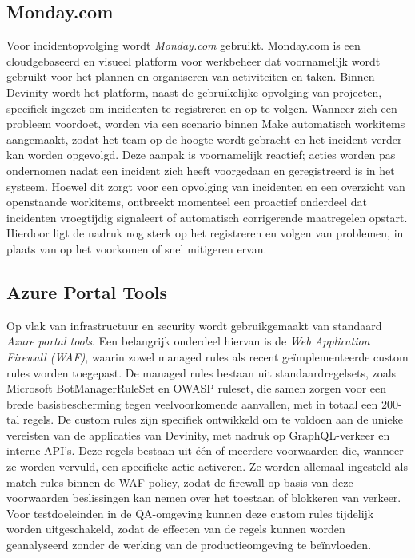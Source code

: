 \subsection{Monday.com}
Voor incidentopvolging wordt \textit{Monday.com} gebruikt. Monday.com is een cloudgebaseerd en visueel platform voor werkbeheer dat voornamelijk wordt gebruikt voor het plannen en organiseren van activiteiten en taken. Binnen Devinity wordt het platform, naast de gebruikelijke opvolging van projecten, specifiek ingezet om incidenten te registreren en op te volgen. Wanneer zich een probleem voordoet, worden via een scenario binnen Make automatisch workitems aangemaakt, zodat het team op de hoogte wordt gebracht en het incident verder kan worden opgevolgd. Deze aanpak is voornamelijk reactief; acties worden pas ondernomen nadat een incident zich heeft voorgedaan en geregistreerd is in het systeem. Hoewel dit zorgt voor een opvolging van incidenten en een overzicht van openstaande workitems, ontbreekt momenteel een proactief onderdeel dat incidenten vroegtijdig signaleert of automatisch corrigerende maatregelen opstart. Hierdoor ligt de nadruk nog sterk op het registreren en volgen van problemen, in plaats van op het voorkomen of snel mitigeren ervan.

\subsection{Azure Portal Tools}
Op vlak van infrastructuur en security wordt gebruikgemaakt van standaard \textit{Azure portal tools}. Een belangrijk onderdeel hiervan is de \textit{Web Application Firewall (WAF)}, waarin zowel managed rules als recent geïmplementeerde custom rules worden toegepast. De managed rules bestaan uit standaardregelsets, zoals Microsoft BotManagerRuleSet en OWASP ruleset, die samen zorgen voor een brede basisbescherming tegen veelvoorkomende aanvallen, met in totaal  een 200-tal regels. De custom rules zijn specifiek ontwikkeld om te voldoen aan de unieke vereisten van de applicaties van Devinity, met nadruk op GraphQL-verkeer en interne API’s. Deze regels bestaan uit één of meerdere voorwaarden die, wanneer ze worden vervuld, een specifieke actie activeren. Ze worden allemaal ingesteld als match rules binnen de WAF-policy, zodat de firewall op basis van deze voorwaarden beslissingen kan nemen over het toestaan of blokkeren van verkeer. Voor testdoeleinden in de QA-omgeving kunnen deze custom rules tijdelijk worden uitgeschakeld, zodat de effecten van de regels kunnen worden geanalyseerd zonder de werking van de productieomgeving te beïnvloeden.

